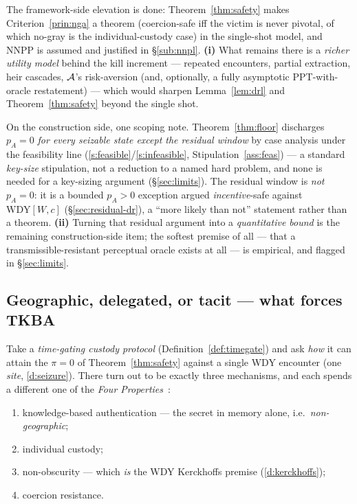 \begin{remark}
The framework-side elevation is done: Theorem~\ref{thm:safety} makes
Criterion~\ref{prin:nga} a theorem (coercion-safe iff the victim is never
pivotal, of which no-gray is the individual-custody case) in the single-shot
model, and NNPP is assumed and justified in \S\ref{sub:nnpl}. \textbf{(i)} What remains there is a
\emph{richer utility model} behind the kill increment --- repeated encounters,
partial extraction, heir cascades, $\mathcal{A}$'s risk-aversion (and, optionally, a
fully asymptotic PPT-with-oracle restatement) --- which would sharpen
Lemma~\ref{lem:drl} and Theorem~\ref{thm:safety} beyond the single shot.

On the construction side, one scoping note. Theorem~\ref{thm:floor} discharges
$p_A = 0$ \emph{for every seizable state except the residual window} by case
analysis under the feasibility line (\ref{s:feasible}/\ref{s:infeasible}, Stipulation~\ref{ass:feas}) --- a
standard \emph{key-size} stipulation, not a reduction to a named hard problem, and
none is needed for a key-sizing argument (\S\ref{sec:limits}). The residual window
is \emph{not} $p_A = 0$: it is a bounded $p_A > 0$ exception argued
\emph{incentive}-safe against $\mathrm{WDY}[W,c]$ (\S\ref{sec:residual-dr}), a ``more
likely than not'' statement rather than a theorem. \textbf{(ii)} Turning that
residual argument into a \emph{quantitative bound} is the remaining construction-side
item; the softest premise of all --- that a transmissible-resistant perceptual
oracle exists at all --- is empirical, and flagged in \S\ref{sec:limits}.
\end{remark}

\subsection{Geographic, delegated, or tacit --- what forces TKBA}
\label{sub:fourprops}

Take a \emph{time-gating custody protocol} (Definition~\ref{def:timegate}) and ask
\emph{how} it can attain the $\pi = 0$ of Theorem~\ref{thm:safety} against a single
WDY encounter (one \emph{site}, \ref{d:seizure}).
There turn out to be exactly three mechanisms,
and each spends a different one of the \emph{Four
Properties}~\cite{gw-fourprops}:
\begin{enumerate}[nosep,leftmargin=2.4em,label=\textbf{(\arabic*)},ref=\arabic*]
  \item\label{p:know} knowledge-based authentication --- the secret in memory
        alone, i.e.\ \emph{non-geographic};
  \item\label{p:indiv} individual custody;
  \item\label{p:nonob} non-obscurity --- which \emph{is} the WDY Kerckhoffs
        premise (\ref{d:kerckhoffs});
  \item\label{p:coerc} coercion resistance.
\end{enumerate}

